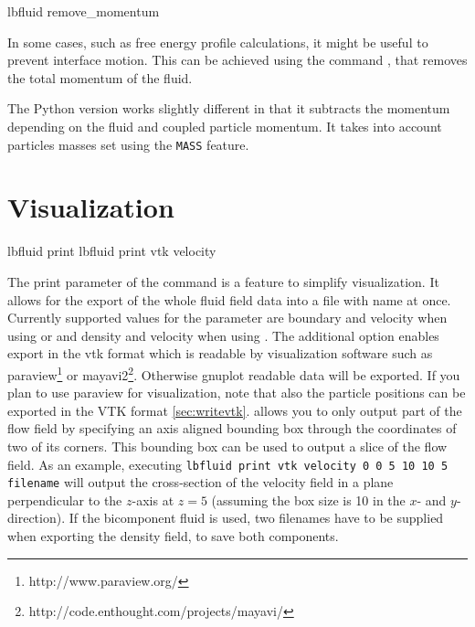 \begin{essyntax}
  lbfluid remove_momentum
  \begin{features}
  \end{features}
\end{essyntax}

In some cases, such as free energy profile calculations, it might be useful to
prevent interface motion. This can be achieved using the command , that removes the total momentum of the fluid.

The Python version works slightly different in that it subtracts the
momentum depending on the fluid and coupled particle momentum.  It
takes into account particles masses set using the \texttt{MASS}
feature.

\section{Visualization}
\label{ssec:LBvisualization}
\begin{essyntax}
   lbfluid print   
   lbfluid print vtk velocity  
\end{essyntax}
The print parameter of the  command is a feature to simplify
visualization. It allows for the export of the whole fluid field data into a
file with name  at once. Currently supported values for the 
parameter  are boundary and velocity when using  or
 and density and velocity when using . The additional
option  enables export in the vtk format which is readable by
visualization software such as paraview\footnote{http://www.paraview.org/} or
mayavi2\footnote{http://code.enthought.com/projects/mayavi/}. Otherwise gnuplot
readable data will be 
exported. If you plan to use paraview for visualization, note that also the 
particle positions can be exported in the VTK format \ref{sec:writevtk}.
 allows you to only output part of the flow field by specifying an
axis aligned bounding box through the coordinates of two of its corners. This
bounding box can be used to output a slice of the flow field. As an example,
executing \texttt{lbfluid print vtk velocity 0 0 5 10 10 5 filename} will
output the cross-section of the velocity field in a plane perpendicular to the
$z$-axis at $z = 5$ (assuming the box size is 10 in the $x$- and
$y$-direction).  If the  bicomponent fluid is used, two filenames
have to be supplied when exporting the density field, to save both components.

